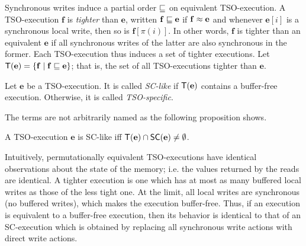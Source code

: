 Synchronous writes induce a partial order $\sqsubseteq$ on equivalent TSO-execution.
A TSO-execution $\mathbf{f}$ is {\em tighter} than $\mathbf{e}$, written $\mathbf{f}\sqsubseteq\mathbf{e}$ if $\mathbf{f}\approx\mathbf{e}$ and whenever $\mathbf{e}[i]$ is a synchronous local write, then so is $\mathbf{f}[\pi(i)]$.
In other words, $\mathbf{f}$ is tighter than an equivalent $\mathbf{e}$ if all synchronous writes of the latter are also synchronous in the former. 
Each TSO-execution thus induces a set of tighter executions.
Let $\mathsf{T}(\mathbf{e})=\{\mathbf{f} \mid \mathbf{f}\sqsubseteq\mathbf{e}\}$; that is, the set of all TSO-executions tighter than $\mathbf{e}$.

\begin{definition}[SC-like]
Let $\mathbf{e}$ be a TSO-execution.
It is called {\em SC-like} if $\mathsf{T}(\mathbf{e})$ contains a buffer-free execution.
Otherwise, it is called {\em TSO-specific}.
\end{definition}
The terms are not arbitrarily named as the following proposition shows.

\begin{proposition}
A TSO-execution $\mathbf{e}$ is SC-like iff $\mathsf{T}(\mathbf{e}) \cap \mathsf{SC}(\mathbf{e}) \neq \emptyset$.
\end{proposition}
Intuitively, permutationally equivalent TSO-executions have identical observations about the state of the memory; i.e. the values returned by the reads are identical.
A tighter execution is one which has at most as many buffered local writes as those of the less tight one. 
At the limit, all local writes are synchronous (no buffered writes), which makes the execution buffer-free.
Thus, if an execution is equivalent to a buffer-free execution, then its behavior is identical to that of an SC-execution which is obtained by replacing all synchronous write actions with direct write actions.

